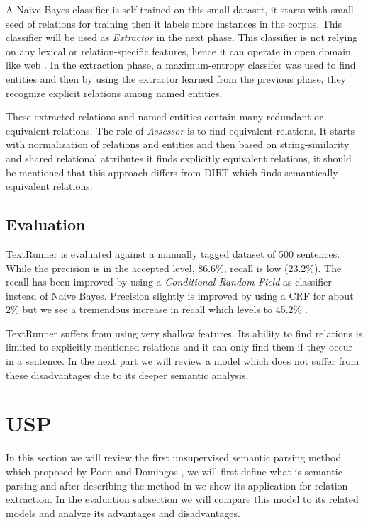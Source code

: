 \documentclass[12pt]{report}
\begin{document}
   
    
    A Naive Bayes classifier is self-trained on this small dataset, it 
   starts with small seed of relations for training then it labels more instances in the corpus. This classifier will be used as
    \emph{Extractor}
   in the next phase. This classifier is not relying on any lexical or relation-specific features, hence it can operate 
   in open domain like web \cite{Banko2009}. In the extraction phase, a maximum-entropy classifer was used to find entities and then by 
   using the extractor learned from the previous phase, they recognize explicit relations among named entities.
   
   These extracted relations and named entities contain many redundant or equivalent relations. The role of \emph{Assessor}
    is to find equivalent relations. It starts with normalization of relations and entities and then based on string-similarity
     and shared relational attributes it finds explicitly equivalent relations, it should be mentioned that 
     this approach differs from DIRT which finds semantically equivalent relations.
     
      
     
\subsection{Evaluation}
\label{ch:eval}
     
     TextRunner is evaluated against a manually tagged dataset of 500 sentences. While the precision is in 
      the accepted level, 86.6\%, recall is low (23.2\%). The recall has been improved by using a \emph{Conditional Random Field}
       \cite{Banko2009} as classifier instead of Naive Bayes. Precision slightly is improved by using a CRF for about 2\%
        but we see a tremendous increase in recall which levels to 45.2\% . 
 
TextRunner suffers from using very shallow features. Its ability to find relations is limited to explicitly mentioned
 relations and it can only find them if they occur in a sentence. In the next part we will review a model 
 which does not suffer from these disadvantages due to its deeper semantic analysis. 
 

\section{USP}
\label{ch:unsupervised}

In this section we will review the first unsupervised semantic parsing method which proposed by Poon and Domingos \cite{Poon2009},
we will first define what is semantic parsing and after describing the method in \cite{Poon2009} we show its application for relation extraction.
In the evaluation subsection we will compare this model to its related models and analyze its advantages and disadvantages.
\end{document}
